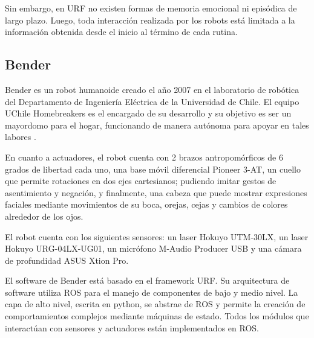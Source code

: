 Sin embargo, en URF no existen formas de memoria emocional ni episódica de largo plazo. Luego, toda interacción realizada por los robots está limitada a la información obtenida desde el inicio al término de cada rutina.



\subsection{Bender}

Bender es un robot humanoide creado el año 2007 en el laboratorio de robótica del Departamento de Ingeniería Eléctrica de la Universidad de Chile. El equipo UChile Homebreakers es el encargado de su desarrollo y  su objetivo es ser un mayordomo para el hogar, funcionando de manera autónoma para apoyar en tales labores \cite{uchile-robotics}.

En cuanto a actuadores, el robot cuenta con 2 brazos antropomórficos de 6 grados de libertad cada uno, una base móvil diferencial Pioneer 3-AT, un cuello que permite rotaciones en dos ejes cartesianos; pudiendo imitar gestos de asentimiento y negación, y finalmente, una cabeza que puede mostrar expresiones faciales mediante movimientos de su boca, orejas, cejas y cambios de colores alrededor de los ojos.

El robot cuenta con los siguientes sensores: un laser Hokuyo UTM-30LX, un laser Hokuyo URG-04LX-UG01, un micrófono M-Audio Producer USB y una cámara de profundidad ASUS Xtion Pro.

El software de Bender está basado en el framework URF. Su arquitectura de software utiliza  ROS para el manejo de componentes de bajo y medio nivel. La capa de alto nivel, escrita en python, se abstrae de ROS y permite la creación de comportamientos complejos mediante máquinas de estado. Todos los módulos que interactúan con sensores y actuadores están implementados en ROS.

